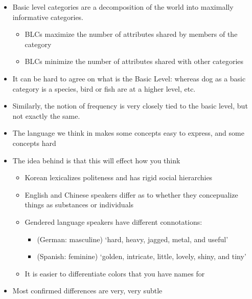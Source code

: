 \documentclass[headrule,footrule]{foils}
\begin{document}
\myslide{}
\begin{itemize}
\item Basic level categories are a decomposition of the world into
  maximally informative categories. 
  \begin{itemize}
  \item BLCs maximize the number of attributes shared by members of
    the category
  \item BLCs minimize the number of attributes shared with
    other categories
  \end{itemize}
\item It can be hard to agree on what is the Basic Level: whereas dog
  as a basic category is a species, bird or fish are at a higher
  level, etc.
\item Similarly, the notion of frequency is very closely tied
  to the basic level, but not exactly the same.
\end{itemize}


\begin{itemize}
\item The language we think in makes some concepts easy to express,
  and some concepts hard
\item The idea behind  is that this will
  effect how you think
  \begin{itemize}
  \item Korean lexicalizes politeness and has rigid social hierarchies
  \item English and Chinese speakers differ as to whether they
    concepualize things as substances or individuals
  \item Gendered language speakers have different connotations: 
    \begin{itemize}
    \item (German: masculine) `hard, heavy, jagged, metal, and useful'
    \item (Spanish: feminine)  `golden, intricate, little, lovely, shiny, and tiny'
    \end{itemize}
  \item It is easier to differentiate colors that you have names for
  \end{itemize}
\item Most confirmed differences are very, very subtle
\end{itemize}


\end{document}
